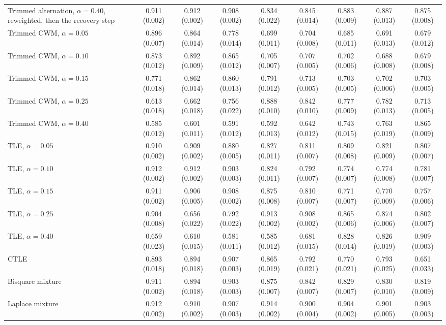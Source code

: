 \begin{table}[htbp]
{\begin{tabular}{lcccccccc}
Trimmed alternation, $\alpha=0.40$, reweighted, then the recovery step & 0.911 (0.002) & 0.912 (0.002) & 0.908 (0.002) & 0.834 (0.022) & 0.845 (0.014) & 0.883 (0.009) & 0.887 (0.013) & 0.875 (0.008) \\
Trimmed CWM, $\alpha=0.05$ & 0.896 (0.007) & 0.864 (0.014) & 0.778 (0.014) & 0.699 (0.011) & 0.704 (0.008) & 0.685 (0.011) & 0.691 (0.013) & 0.679 (0.012) \\
Trimmed CWM, $\alpha=0.10$ & 0.873 (0.012) & 0.892 (0.009) & 0.865 (0.012) & 0.705 (0.007) & 0.707 (0.005) & 0.702 (0.006) & 0.688 (0.008) & 0.679 (0.008) \\
Trimmed CWM, $\alpha=0.15$ & 0.771 (0.018) & 0.862 (0.014) & 0.860 (0.013) & 0.791 (0.012) & 0.713 (0.005) & 0.703 (0.005) & 0.702 (0.006) & 0.703 (0.005) \\
Trimmed CWM, $\alpha=0.25$ & 0.613 (0.018) & 0.662 (0.018) & 0.756 (0.022) & 0.888 (0.010) & 0.842 (0.010) & 0.777 (0.009) & 0.782 (0.013) & 0.713 (0.005) \\
Trimmed CWM, $\alpha=0.40$ & 0.585 (0.012) & 0.601 (0.011) & 0.591 (0.012) & 0.592 (0.013) & 0.642 (0.012) & 0.743 (0.015) & 0.763 (0.019) & 0.865 (0.009) \\
TLE, $\alpha=0.05$ & 0.910 (0.002) & 0.909 (0.002) & 0.880 (0.005) & 0.827 (0.011) & 0.811 (0.007) & 0.809 (0.008) & 0.821 (0.009) & 0.807 (0.007) \\
TLE, $\alpha=0.10$ & 0.912 (0.002) & 0.912 (0.002) & 0.903 (0.003) & 0.824 (0.011) & 0.792 (0.007) & 0.774 (0.007) & 0.774 (0.008) & 0.781 (0.007) \\
TLE, $\alpha=0.15$ & 0.911 (0.002) & 0.906 (0.005) & 0.908 (0.002) & 0.875 (0.008) & 0.810 (0.007) & 0.771 (0.007) & 0.770 (0.009) & 0.757 (0.006) \\
TLE, $\alpha=0.25$ & 0.904 (0.008) & 0.656 (0.022) & 0.792 (0.022) & 0.913 (0.002) & 0.908 (0.002) & 0.865 (0.006) & 0.874 (0.006) & 0.802 (0.007) \\
TLE, $\alpha=0.40$ & 0.659 (0.023) & 0.610 (0.015) & 0.581 (0.011) & 0.585 (0.012) & 0.681 (0.015) & 0.828 (0.014) & 0.826 (0.019) & 0.909 (0.003) \\
CTLE & 0.893 (0.018) & 0.894 (0.018) & 0.907 (0.003) & 0.865 (0.019) & 0.792 (0.021) & 0.770 (0.021) & 0.793 (0.025) & 0.651 (0.033) \\
Bisquare mixture & 0.911 (0.002) & 0.894 (0.018) & 0.903 (0.003) & 0.875 (0.007) & 0.842 (0.007) & 0.829 (0.007) & 0.830 (0.010) & 0.819 (0.009) \\
Laplace mixture & 0.912 (0.002) & 0.910 (0.002) & 0.907 (0.003) & 0.914 (0.002) & 0.900 (0.004) & 0.904 (0.002) & 0.901 (0.005) & 0.903 (0.003) \\

\end{tabular}}
\end{table}
